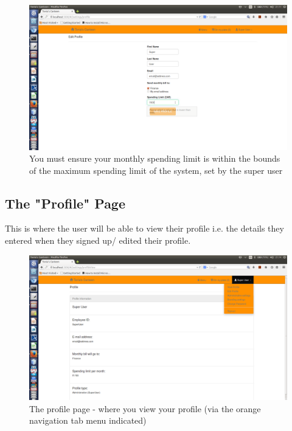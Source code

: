 \documentclass[a4paper,12pt]{report}
\begin{document}
\begin{figure}[H]
  \centering
    \includegraphics[width=1.0\textwidth]{screenshots/limitExeeds.png}
    \caption{You must ensure your monthly spending limit is within the bounds of the maximum spending limit of the system, set by the super user} 
\end{figure}

\subsection{The "Profile" Page} 
This is where the user will be able to view their profile i.e. the details they entered when they signed up/ edited their profile. 

\begin{figure}[H]
  \centering
    \includegraphics[width=1.0\textwidth]{screenshots/viewProfile.png}
    \caption{The profile page - where you view your profile (via the orange navigation tab menu indicated)} 
\end{figure}

\end{document}
